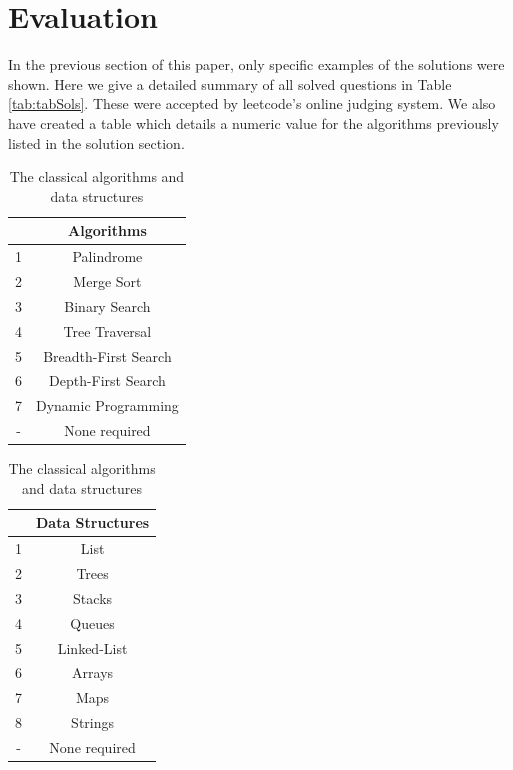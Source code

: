 \documentclass[10pt,twocolumn]{IEEEtran}
\begin{document}
\section{Evaluation}
In the previous section of this paper, only specific examples of the solutions were shown. Here we give a detailed summary of all solved questions in Table \ref{tab:tabSols}. These were accepted by leetcode's online judging system. 
We also have created a table which details a numeric value for the algorithms previously listed in the solution section.
\begin{table}
\parbox{.45\linewidth}{
\centering
\begin{tabular}{|c|c|}
		    &Algorithms \\ \hline
		1 & Palindrome\\ \hline
		2 & Merge Sort\\ \hline
		3 & Binary Search\\ \hline
		4 & Tree Traversal \\ \hline
		5 & Breadth-First Search\\ \hline
		6 & Depth-First Search\\ \hline
		7 & Dynamic Programming\\ \hline
		- & None required\\ \hline
\end{tabular}
\caption{The classical algorithms and data structures}
\label{tab:classicalAlgos}
}
\hfill
\parbox{.45\linewidth}{
\centering
\begin{tabular}{|c|c|}
	&Data Structures \\ \hline
	1 & List\\ \hline
	2 & Trees\\ \hline
	3 & Stacks\\ \hline
	4 & Queues \\ \hline
	5 & Linked-List\\ \hline
	6 & Arrays\\ \hline
	7 & Maps\\ \hline	
	8&Strings\\ \hline
	-&None required\\
\end{tabular}
}
\end{table}
\end{document}
